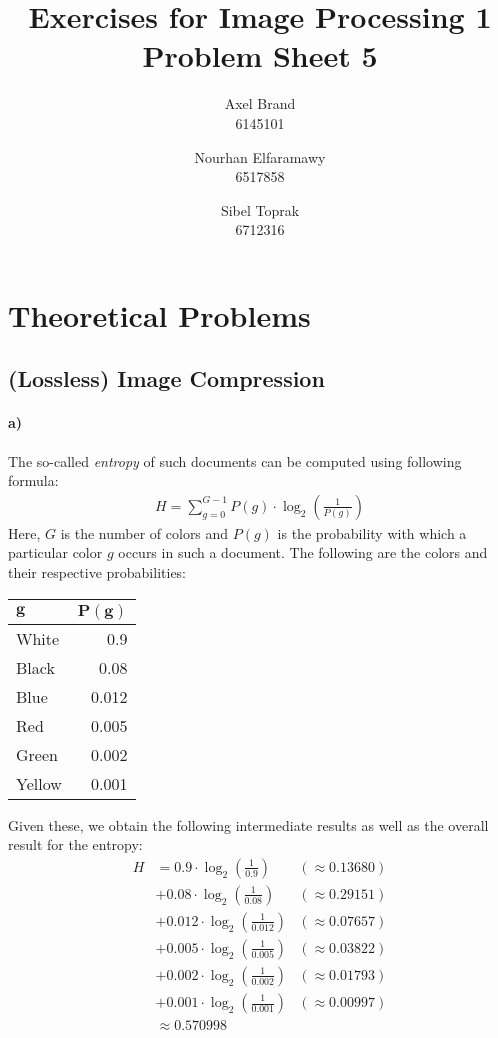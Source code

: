 \documentclass[a4paper,twocolumn]{article}
\title{\textbf{Exercises for Image Processing 1}\\Problem Sheet 5}
\author{Axel Brand\\6145101 \and Nourhan Elfaramawy\\6517858 \and Sibel Toprak\\6712316}
\begin{document}
	\maketitle
	
	\section{Theoretical Problems}
	
	\subsection{(Lossless) Image Compression}
	
	\paragraph{a)} %
	The so-called \textit{entropy} of such documents can be computed using following formula:
	\begin{align*}
	H = \sum_{g=0}^{G-1} P(g) \cdot \log_{2}\left(\frac{1}{P(g)}\right)
	\end{align*}
	Here, $G$ is the number of colors and $P(g)$ is the probability with which a particular color $g$ occurs in such a document. The following are the colors and their respective probabilities:
	\begin{center}
		\begin{tabular}{l r}
			$\mathbf{g}$ & $\mathbf{P(g)}$ \\
			\hline
			White  & 0.9   \\
			Black  & 0.08  \\
			Blue   & 0.012 \\
			Red    & 0.005 \\
			Green  & 0.002 \\
			Yellow & 0.001 \\
		\end{tabular}
	\end{center}
	Given these, we obtain the following intermediate results as well as the overall result for the entropy:
	\begin{align*}
	H
	&= 0.9 \cdot \log_{2}\left(\frac{1}{0.9}\right)
	&(\approx 0.13680) \\
	&+ 0.08 \cdot \log_{2}\left(\frac{1}{0.08}\right)
	&(\approx 0.29151) \\
	&+ 0.012 \cdot \log_{2}\left(\frac{1}{0.012}\right)
	&(\approx 0.07657) \\
	&+ 0.005 \cdot \log_{2}\left(\frac{1}{0.005}\right)
	&(\approx 0.03822) \\
	&+ 0.002 \cdot \log_{2}\left(\frac{1}{0.002}\right)
	&(\approx 0.01793) \\
	&+ 0.001 \cdot \log_{2}\left(\frac{1}{0.001}\right)
	&(\approx 0.00997) \\
	&\approx 0.570998
	\end{align*}
	
\end{document}
